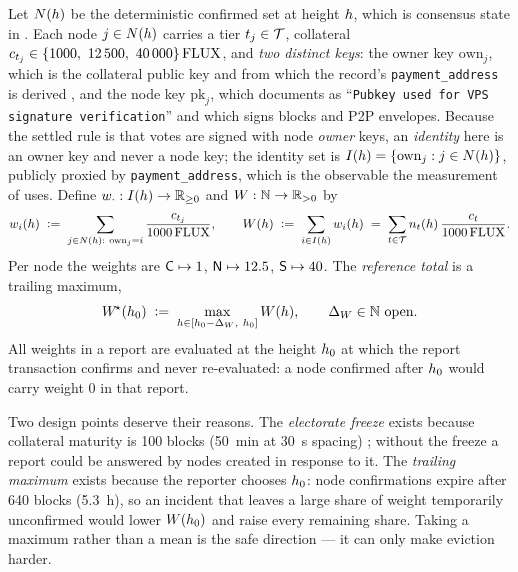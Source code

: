 \begin{definition}
\label{def:23:electorate}
Let $N(h)$ be the deterministic confirmed \FluxNode{} set at height $h$, which is consensus
state in \fluxd. Each node $j \in N(h)$ carries a tier $t_j \in \mathcal{T}$, collateral
$c_{t_j} \in \{\num{1000},\ \num{12500},\ \num{40000}\}\,\mathrm{FLUX}$, and \emph{two distinct keys}: the
owner key $\mathrm{own}_j$, which is the collateral public key and from which the record's
\texttt{payment\_address} is derived
, and the node key $\mathrm{pk}_j$, which
\fluxd{} documents as ``\texttt{Pubkey used for VPS signature verification}''
 and which signs \PoN{} blocks and \FluxOS{} P2P
envelopes. Because the settled rule is that votes are signed with node \emph{owner} keys, an
\emph{identity} here is an owner key and never a node key; the identity set is
$I(h) = \{\mathrm{own}_j : j \in N(h)\}$, publicly proxied by \texttt{payment\_address}, which
is the observable the measurement of  uses. Define
$w_{\cdot} : I(h) \to \mathbb{R}_{\ge 0}$ and $W : \mathbb{N} \to \mathbb{R}_{>0}$ by
\[
w_{i}(h) \;\vcentcolon=\; \sum_{j \in N(h):\ \mathrm{own}_j = i}
  \frac{c_{t_j}}{\num{1000}\,\mathrm{FLUX}},
\qquad
W(h) \;\vcentcolon=\; \sum_{i \in I(h)} w_{i}(h)
  \;=\; \sum_{t \in \mathcal{T}} n_{t}(h)\,\frac{c_{t}}{\num{1000}\,\mathrm{FLUX}}.
\]
Per node the weights are $\mathsf{C} \mapsto 1$, $\mathsf{N} \mapsto 12.5$, $\mathsf{S} \mapsto 40$. The
\emph{reference total} is a trailing maximum,
\[
W^{\!\star}(h_0) \;\vcentcolon=\; \max_{h \in [h_0 - \Delta_W,\ h_0]} W(h),
\qquad \Delta_W \in \mathbb{N}\ \text{open}.
\]
All weights in a report are evaluated at the height $h_0$ at which the report transaction
confirms and never re-evaluated: a node confirmed after $h_0$ would carry weight $0$ in that
report.
\end{definition}

Two design points deserve their reasons. The \emph{electorate freeze} exists because collateral
maturity is 100 blocks (\SI{50}{\minute} at \SI{30}{\second} spacing)
; without the freeze a report
could be answered by nodes created in response to it. The \emph{trailing maximum} exists because
the reporter chooses $h_0$: node confirmations expire after 640 blocks (\SI{5.3}{\hour}), so an
incident that leaves a large share of weight temporarily unconfirmed would lower $W(h_0)$
and raise every remaining share. Taking a maximum rather than a mean is the safe direction — it can
only make eviction harder.

